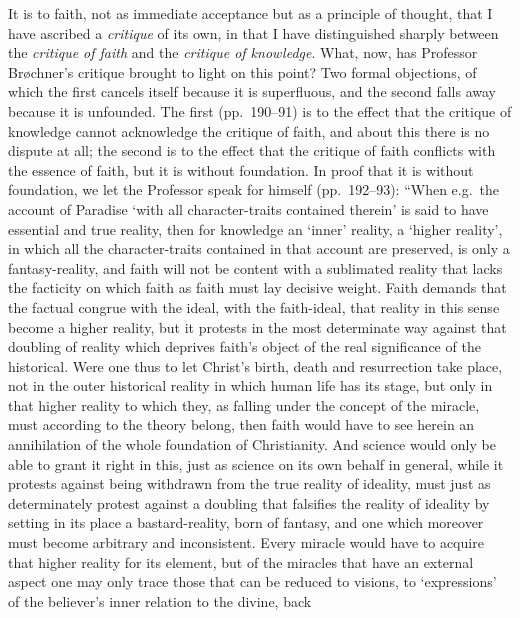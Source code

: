 \documentclass[12pt]{book}
\newcommand{\opage}[1]{\marginnote{\footnotesize\textit{[#1]}}}
\begin{document}
It is to faith, not as immediate acceptance but as a principle of thought,
that I have ascribed a \emph{critique} of its own, in that I have
distinguished sharply between the \emph{critique of faith} and the
\emph{critique of knowledge}. What, now, has Professor Brøchner's critique
brought to light on this point? Two formal objections, of which the first
cancels itself because it is superfluous, and the second falls away because
it is unfounded. The first (pp.\ 190--91) is to the effect that the
critique of knowledge cannot acknowledge the critique of faith, and about
this there is
\opage{5}\setcounter{footnote}{0}%
no dispute at all; the second is to the effect that the critique of faith
conflicts with the essence of faith, but it is without foundation. In proof
that it is without foundation, we let the Professor speak for himself
(pp.\ 192--93): ``When e.g.\ the account of Paradise `with all
character-traits contained therein' is said to have essential and true
reality, then for knowledge an `inner' reality, a `higher reality', in which
all the character-traits contained in that account are preserved, is only a
fantasy-reality, and faith will not be content with a sublimated reality
that lacks the facticity on which faith as faith must lay decisive weight.
Faith demands that the factual congrue with the ideal, with the faith-ideal,
that reality in this sense become a higher reality, but it protests in the
most determinate way against that doubling of reality which deprives faith's
object of the real significance of the historical. Were one thus to let
Christ's birth, death and resurrection take place, not in the outer
historical reality in which human life has its stage, but only in that
higher reality to which they, as falling under the concept of the miracle,
must according to the theory belong, then faith would have to see herein an
annihilation of the whole foundation of Christianity. And science would only
be able to grant it right in this, just as science on its own behalf in
general, while it protests against being withdrawn from the true reality of
ideality, must just as determinately protest against a doubling that
falsifies the reality of ideality by setting in its place a bastard-reality,
born of fantasy, and one which moreover must become arbitrary and
inconsistent. Every miracle would have to acquire that higher reality for
its element, but of the miracles that have an external aspect one may only
trace those that can be reduced to visions, to `expressions' of the
believer's inner relation to the divine, back
\end{document}
